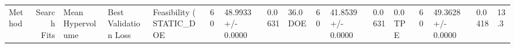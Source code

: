 \begin{tabular}{lrlll}
\toprule
Method & Search Fits & Mean Hypervolume & Best Validation Loss & Feasibility (%
\midrule
STATIC_DOE & 60 & 48.9933 +/- 0.0000 & 0.0631 & 36.0%
DOE & 60 & 41.8539 +/- 0.0000 & 0.0631 & 0.0%
TPE & 60 & 49.3628 +/- 0.0000 & 0.0418 & 13.3%
\bottomrule
\end{tabular}
